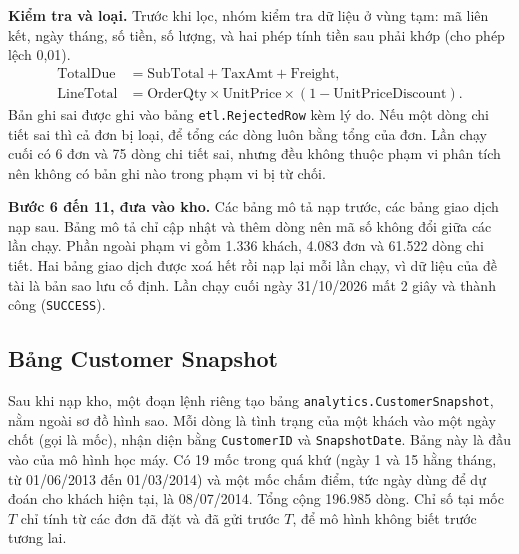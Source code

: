 \textbf{Kiểm tra và loại.} Trước khi lọc, nhóm kiểm tra dữ liệu ở vùng tạm: mã liên kết, ngày tháng, số tiền, số lượng, và hai phép tính tiền sau phải khớp (cho phép lệch 0,01).
\begin{align*}
\text{TotalDue} &= \text{SubTotal} + \text{TaxAmt} + \text{Freight}, \\
\text{LineTotal} &= \text{OrderQty} \times \text{UnitPrice} \times (1 - \text{UnitPriceDiscount}).
\end{align*}
Bản ghi sai được ghi vào bảng \texttt{etl.RejectedRow} kèm lý do. Nếu một dòng chi tiết sai thì cả đơn bị loại, để tổng các dòng luôn bằng tổng của đơn. Lần chạy cuối có 6 đơn và 75 dòng chi tiết sai, nhưng đều không thuộc phạm vi phân tích nên không có bản ghi nào trong phạm vi bị từ chối.

\textbf{Bước 6 đến 11, đưa vào kho.} Các bảng mô tả nạp trước, các bảng giao dịch nạp sau. Bảng mô tả chỉ cập nhật và thêm dòng nên mã số không đổi giữa các lần chạy. Phần ngoài phạm vi gồm 1.336 khách, 4.083 đơn và 61.522 dòng chi tiết. Hai bảng giao dịch được xoá hết rồi nạp lại mỗi lần chạy, vì dữ liệu của đề tài là bản sao lưu cố định. Lần chạy cuối ngày 31/10/2026 mất 2 giây và thành công (\texttt{SUCCESS}).

\subsection{Bảng Customer Snapshot}
Sau khi nạp kho, một đoạn lệnh riêng tạo bảng \texttt{analytics.\allowbreak CustomerSnapshot}, nằm ngoài sơ đồ hình sao. Mỗi dòng là tình trạng của một khách vào một ngày chốt (gọi là mốc), nhận diện bằng \texttt{CustomerID} và \texttt{SnapshotDate}. Bảng này là đầu vào của mô hình học máy. Có 19 mốc trong quá khứ (ngày 1 và 15 hằng tháng, từ 01/06/2013 đến 01/03/2014) và một mốc chấm điểm, tức ngày dùng để dự đoán cho khách hiện tại, là 08/07/2014. Tổng cộng 196.985 dòng. Chỉ số tại mốc $T$ chỉ tính từ các đơn đã đặt và đã gửi trước $T$, để mô hình không biết trước tương lai.

